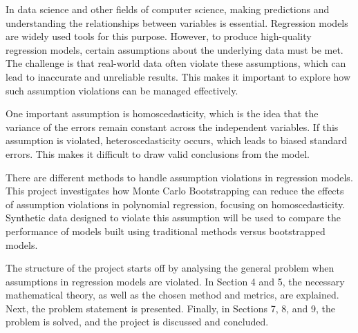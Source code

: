 In data science and other fields of computer science, making predictions and understanding the relationships between variables is essential. Regression models are widely used tools for this purpose. However, to produce high-quality regression models, certain assumptions about the underlying data must be met. The challenge is that real-world data often violate these assumptions, which can lead to inaccurate and unreliable results. This makes it important to explore how such assumption violations can be managed effectively. \newline

\noindent One important assumption is homoscedasticity, which is the idea that the variance of the errors remain constant across the independent variables. If this assumption is violated, heteroscedasticity occurs, which leads to biased standard errors. This makes it difficult to draw valid conclusions from the model. \newline


\noindent There are different methods to handle assumption violations in regression models. This project investigates how Monte Carlo Bootstrapping can reduce the effects of assumption violations in polynomial regression, focusing on homoscedasticity. Synthetic data designed to violate this assumption will be used to compare the performance of models built using traditional methods versus bootstrapped models.\newline

\noindent The structure of the project starts off by analysing the general problem when assumptions in regression models are violated. In Section 4 and 5, the necessary mathematical theory, as well as the chosen method and metrics, are explained. Next, the problem statement is presented. Finally, in Sections 7, 8, and 9, the problem is solved, and the project is discussed and concluded.
